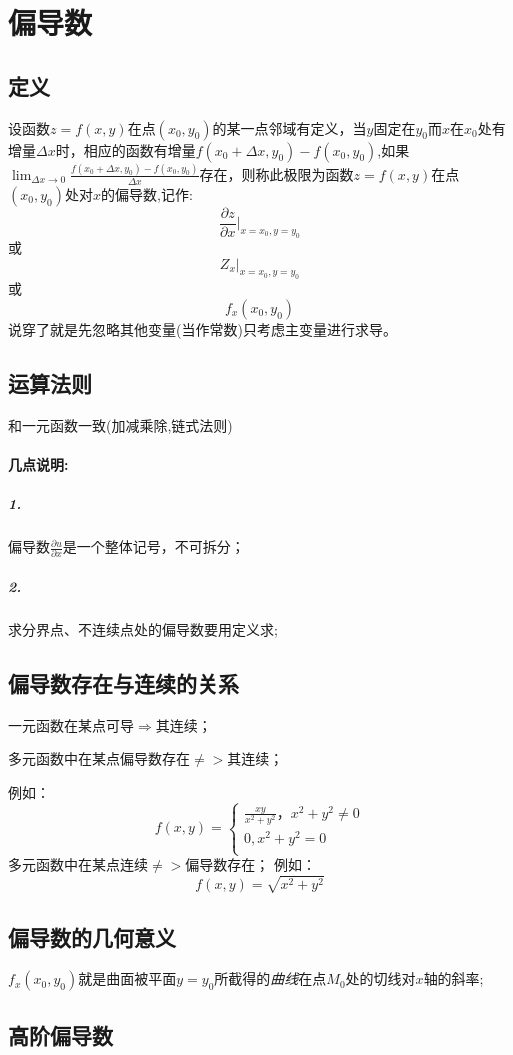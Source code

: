 \documentclass{ctexart}
\begin{document}
  \section{偏导数}
        \subsection{定义}
        设函数$z=f(x,y)$在点$(x_0,y_0)$的某一点邻域有定义，当$y$固定在$y_0$而$x$在$x_0$处有增量$\Delta x$时，相应的函数有增量$f(x_0+\Delta x,y_0)-f(x_0,y_0)$,如果$\lim_{\Delta x \to 0}{\frac{f(x_0+\Delta x,y_0)-f(x_0,y_0)}{\Delta x}}$存在，则称此极限为函数$z=f(x,y)$在点$(x_0,y_0)$处对$x$的偏导数,记作:
            $$\frac{\partial z}{\partial x} |_{x=x_0,y=y_0}$$
            或
            $$Z_x|_{x=x_0,y=y_0}$$
            或
            $$f_x(x_0,y_0)$$
        说穿了就是先忽略其他变量(当作常数)只考虑主变量进行求导。
        \subsection{运算法则}
          和一元函数一致(加减乘除,链式法则)
          
          \paragraph{几点说明:}
        \subparagraph{1.}偏导数$\frac{\partial u}{\partial x}$是一个整体记号，不可拆分；
        \subparagraph{2.}求分界点、不连续点处的偏导数要用定义求;
    \subsection{偏导数存在与连续的关系}
        一元函数在某点可导$\Rightarrow$其连续；

        多元函数中在某点偏导数存在$\neq>$其连续；

        例如：
        $$f(x,y)=\begin{cases}
          \frac{xy}{x^2+y^2}，x^2+y^2 \neq 0\\
          0,x^2+y^2=0\\
        \end{cases}$$
        多元函数中在某点连续$\neq>$偏导数存在；
        例如：
          $$f(x,y)=\sqrt{x^2+y^2}$$
    \subsection{偏导数的几何意义}
        $f_x(x_0,y_0)$就是曲面被平面$y=y_0$所截得的\emph{曲线}在点$M_0$处的切线对$x$轴的斜率;
    \subsection{高阶偏导数}
\end{document}
